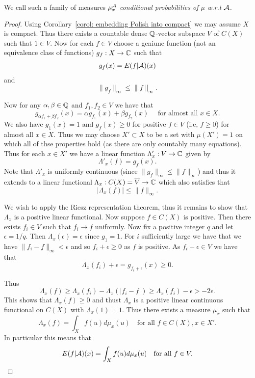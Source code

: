 \documentclass[twoside, a4paper, 10pt]{amsart}
\begin{document}
\begin{mydef} We call such a family of measures $\mu^{\mathcal{A}}_x$ \textit{conditional probabilities of $\mu$ w.r.t $\mathcal{A}$}.

\end{mydef}

\begin{proof} Using Corollary~\ref{corol: embedding Polish into compact} we may assume $X$ is compact. Thus there exists a countable dense $\mathbb{Q}$-vector subspace $V$ of $C(X)$ such that $1 \in V$. Now for each $f \in V$ choose a geniune function (not an equivalence class of functions) $g_f:X \to \mathbb{C}$ such that $$g_f(x) = E(f|\mathcal{A})(x)$$ and $$\|g_f\|_{\infty} \leq \|f\|_{\infty}.$$

 Now for any $\alpha,\beta \in \mathbb{Q}$ and $f_1,f_2 \in V$ we have that $$g_{\alpha f_1 + \beta f_2}(x) = \alpha g_{f_1}(x) + \beta g_{f_2}(x)\quad \text{ for almost all } x \in X.$$ We also have $g_1(x) = 1$ and $g_f(x) \geq 0$ for positive $f \in V$ (i.e, $f\geq 0$) for almost all $x \in X$. Thus we may choose $X' \subset X$ to be a set with $\mu(X')=1$ on which all of thse properties hold (as there are only countably many equations). Thus for each $x \in X'$ we have a linear function $\Lambda'_x: V \to \mathbb{C}$ given by $$\Lambda'_x (f)= g_f(x).$$ Note that $\Lambda'_x$ is uniformly continuous (since $\|g_f\|_{\infty} \leq \|f\|_{\infty}$) and thus it extends to a linear functional $\Lambda_x:C(X) = \overline{V} \to \mathbb{C}$ which also satisfies that $$|\Lambda_x (f)| \leq \|f\|_{\infty}.$$ 

We wish to apply the Riesz representation theorem, thus it remains to show that $\Lambda_x$ is a positive linear functional. Now suppose $f \in C(X)$ is positive. Then there exists $f_i \in V$ such that $f_i \to f$ uniformly. Now fix a positive integer $q$ and let $\epsilon = 1/q$. Then $\Lambda_x(\epsilon) = \epsilon$ since $g_1=1$. For $i$ sufficiently large we have that we have $\|f_i - f\|_{\infty} < \epsilon$  and so $f_i + \epsilon \geq 0$ as $f$ is positive. As $f_i + \epsilon \in V$ we have that $$\Lambda_x(f_i) + \epsilon = g_{f_i + \epsilon}(x) \geq 0.$$ 

Thus $$\Lambda_x(f) \geq \Lambda_x(f_i) - \Lambda_x(|f_i - f|) \geq \Lambda_x(f_i) - \epsilon> -2\epsilon.$$ This shows that $\Lambda_x(f) \geq 0$ and thust $\Lambda_x$ is a positive linear continuous functional on $C(X)$ with $\Lambda_x(1)=1$. Thus there exists a measure $\mu_x$ such that $$\Lambda_x(f) = \int_X f(u) d\mu_x(u) \quad \text{for all } f \in C(X), x \in X'.$$ In particular this means that $$ E(f|\mathcal{A})(x) = \int_X f(u) d\mu_x(u) \quad \text{for all } f \in V.$$


\end{proof}
\end{document}
